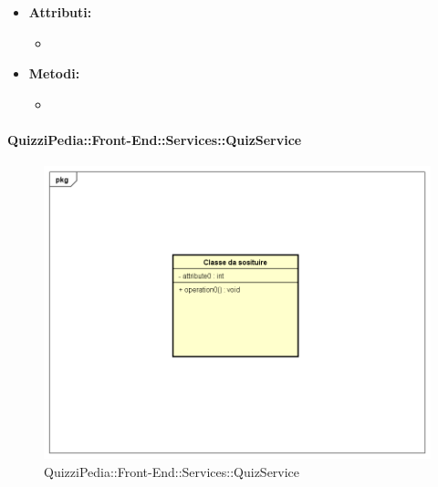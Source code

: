 \begin{itemize}
\begin{itemize}
	\end{itemize}
	\item \textbf{Attributi:}
	\begin{itemize}
		\item 
	\end{itemize}
	\item \textbf{Metodi:}
	\begin{itemize}
		\item 
	\end{itemize}
\end{itemize}

\paragraph{QuizziPedia::Front-End::Services::QuizService}
\begin{figure}
	\centering
	\includegraphics[scale=0.45]{UML/Classi/Front-End/Temporanea.png}
	\caption{QuizziPedia::Front-End::Services::QuizService}
\end{figure}
